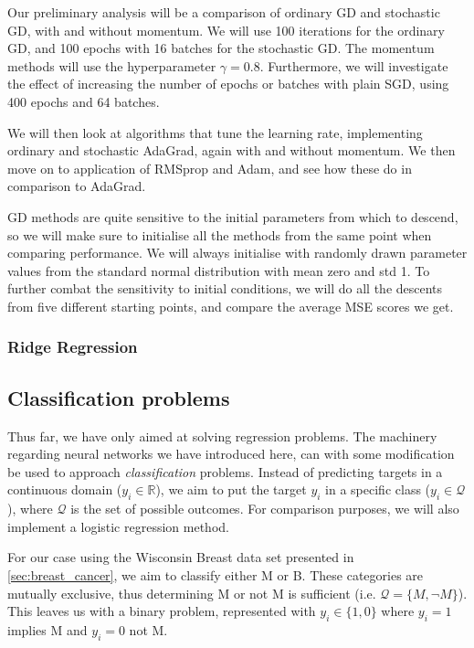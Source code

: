         Our preliminary analysis will be a comparison of ordinary GD and stochastic GD, with and without momentum. We will use 100 iterations for the ordinary GD, and 100 epochs with 16 batches for the stochastic GD. The momentum methods will use the hyperparameter $\gamma=0.8$. Furthermore, we will investigate the effect of increasing the number of epochs or batches with plain SGD, using 400 epochs and 64 batches.

        We will then look at algorithms that tune the learning rate, implementing ordinary and stochastic AdaGrad, again with and without momentum. We then move on to application of RMSprop and Adam, and see how these do in comparison to AdaGrad.

        GD methods are quite sensitive to the initial parameters from which to descend, so we will make sure to initialise all the methods from the same point when comparing performance. We will always initialise with randomly drawn parameter values from the standard normal distribution with mean zero and std 1. To further combat the sensitivity to initial conditions, we will do all the descents from five different starting points, and compare the average MSE scores we get.
        \\

    \subsubsection{Ridge Regression}

    
\subsection{Classification problems}
    Thus far, we have only aimed at solving regression problems. The machinery regarding neural networks we have introduced here, can with some modification be used to approach \textit{classification} problems. Instead of predicting targets in a continuous domain ($y_i \in \mathbb{R}$), we aim to put the target $y_i$ in a specific class ($y_i \in \mathcal{Q}$), where $\mathcal{Q}$ is the set of possible outcomes. For comparison purposes, we will also implement a logistic regression method.

    For our case using the Wisconsin Breast data set presented in \cref{sec:breast_cancer}, we aim to classify either M or B. These categories are mutually exclusive, thus determining M or not M is sufficient (i.e. $\mathcal{Q} = \{ M, \neg M \}$). This leaves us with a binary problem, represented with $y_i \in \{ 1, 0 \}$ where $y_i = 1$ implies M and $y_i = 0$ not M.

